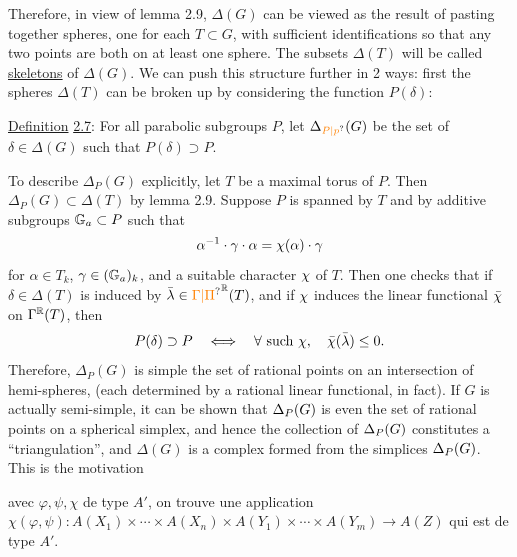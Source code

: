Therefore, in view of lemma 2.9, $\Delta(G)$ can be viewed as the result of pasting together spheres, one for each $T\subset G$, with sufficient identifications so that any two points are both on at least one sphere. The subsets $\Delta(T)$ will be called \uline{skeletons} of $\Delta(G)$. We can push this structure further in 2 ways: first the spheres $\Delta(T)$ can be broken up by considering the function $P(\delta)$:

\uline{Definition} \uline{2.7}: For all parabolic subgroups $P$, let $\Delta_{\handwritten{\unsure{P|p}}}(G)$ be the set of $\delta\in\Delta(G)$ such that $P(\delta)\supset P$.

To describe $\Delta_P(G)$ explicitly, let $T$ be a maximal torus of $P$. Then $\Delta_P(G)\subset\Delta(T)$ by lemma 2.9. Suppose $P$ is spanned by $T$ and by additive subgroups $\mathbb{G}_a\subset P$ such that
\[
 \alpha^{-1}\cdot\gamma\cdot\alpha=\chi(\alpha)\cdot\gamma
\]
for $\alpha\in T_k$, $\gamma\in(\mathbb{G}_a)_k$, and a suitable character $\chi$ of $T$. Then one checks that if $\delta\in\Delta(T)$ is induced by $\bar{\lambda}\in\unsure{\Gamma|\Pi}^{\handwritten{\mathbb{R}}}(T)$, and if $\chi$ induces the linear functional $\bar{\chi}$ on $\Gamma^{\mathbb{R}}(T)$, then
\[
 P(\delta)\supset P\quad\Longleftrightarrow\quad\forall\text{ such }\chi,\quad\bar{\chi}(\bar{\lambda})\leq 0.
\]
Therefore, $\Delta_P(G)$ is simple the set of rational points on an intersection of hemi-spheres, (each determined by a rational linear functional, in fact). If $G$ is actually semi-simple, it can be shown that $\Delta_{P}(G)$ is even the set of rational points on a spherical simplex, and hence the collection of $\Delta_{P}(G)$ constitutes a ``triangulation'', and $\Delta(G)$ is a complex formed from the simplices $\Delta_{P}(G)$. This is the motivation

avec $\varphi,\psi,\chi$ de type $A'$, on trouve une application  $\chi(\varphi,\psi)\colon A(X_1)\times\cdots\times A(X_n)\times A(Y_1)\times\cdots\times A(Y_m)\longrightarrow A(Z)$ qui est de type $A'$.


